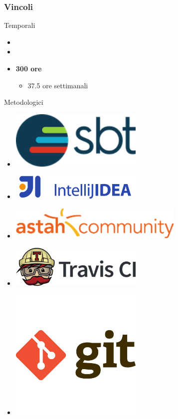 \begin{frame}[t]
\frametitle{Vincoli}
\begin{minipage}[t]{.31\textwidth}
Temporali
\begin{itemize}
\item[]
\item[]
\item[] \textbf{300 ore}
\begin{itemize}
\item[] 37.5 ore settimanali
\end{itemize}
\end{itemize}
\end{minipage}
\vrule{}
\begin{minipage}[t]{.32\textwidth} 
Metodologici
\begin{itemize}
\item[] \includegraphics[width=0.50\textwidth]{img/sbt-logo}
\item[] \includegraphics[width=0.50\textwidth]{img/intellij-logo}
\item[] \includegraphics[width=0.66\textwidth]{img/astah-logo}
\item[] \includegraphics[width=0.50\textwidth]{img/travisci-logo}
\item[] \includegraphics[width=0.50\textwidth]{img/git-logo.jpg}

\end{itemize}
\end{minipage}
\end{frame}
